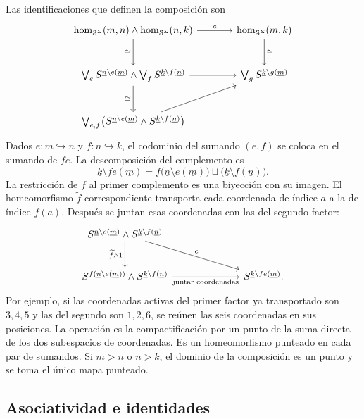 Las identificaciones que definen la composición son
\[
\begin{tikzcd}[column sep=large,row sep=large]
\hom_{\mathcal S^\Sigma}(m,n)\wedge\hom_{\mathcal S^\Sigma}(n,k)
  \arrow[r,"c"]\arrow[d,"\cong"']&
\hom_{\mathcal S^\Sigma}(m,k)\arrow[d,"\cong"]\\
\textstyle\bigvee\nolimits_e S^{\underline n\setminus e(\underline m)}
\wedge\textstyle\bigvee\nolimits_f S^{\underline k\setminus f(\underline n)}
  \arrow[r]\arrow[d,"\cong"']&
\textstyle\bigvee\nolimits_g S^{\underline k\setminus g(\underline m)}\\
\textstyle\bigvee\nolimits_{e,f}
\bigl(S^{\underline n\setminus e(\underline m)}
\wedge S^{\underline k\setminus f(\underline n)}\bigr)
  \arrow[ur]&
\end{tikzcd}
\]
Dados $e\colon\underline m\hookrightarrow\underline n$ y $f\colon\underline n\hookrightarrow\underline k$, el codominio del sumando $(e,f)$ se coloca en el sumando de $fe$. La descomposición del complemento es
\[
\underline k\setminus fe(\underline m)
=f\bigl(\underline n\setminus e(\underline m)\bigr)
\sqcup \bigl(\underline k\setminus f(\underline n)\bigr).
\]
La restricción de $f$ al primer complemento es una biyección con su imagen. El homeomorfismo $\widetilde f$ correspondiente transporta cada coordenada de índice $a$ a la de índice $f(a)$. Después se juntan esas coordenadas con las del segundo factor:
\[
\begin{tikzcd}[column sep={24mm,between borders},row sep=large]
S^{\underline n\setminus e(\underline m)}
 \wedge S^{\underline k\setminus f(\underline n)}
 \arrow[d,"\widetilde f\wedge1"']
 \arrow[dr,"c"]&\\
S^{f(\underline n\setminus e(\underline m))}
 \wedge S^{\underline k\setminus f(\underline n)}
 \arrow[r,"\text{juntar coordenadas}"'{sloped}]&
S^{\underline k\setminus fe(\underline m)} .
\end{tikzcd}
\]
Por ejemplo, si las coordenadas activas del primer factor ya transportado son $3,4,5$ y las del segundo son $1,2,6$, se reúnen las seis coordenadas en sus posiciones. La operación es la compactificación por un punto de la suma directa de los dos subespacios de coordenadas. Es un homeomorfismo punteado en cada par de sumandos. Si $m>n$ o $n>k$, el dominio de la composición es un punto y se toma el único mapa punteado.

\subsection{Asociatividad e identidades}

